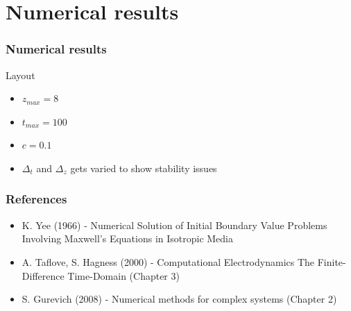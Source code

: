 \documentclass[ignorenonframetext]{beamer}
\begin{document}
\section{Numerical results}
\begin{frame}
\frametitle{Numerical results}
Layout
\begin{itemize}

\item $z_{max} = 8$
\item $t_{max} = 100$
\item $c = 0.1$
\item $\Delta_t$ and $\Delta_z$ gets varied to show stability issues
\end{itemize}
\end{frame}
\begin{frame}
\frametitle{References}
\begin{itemize}

\item K. Yee (1966) - Numerical Solution of Initial Boundary Value Problems Involving Maxwell’s Equations in Isotropic Media 
\item A. Taflove, S. Hagness (2000) - Computational Electrodynamics The Finite-Difference Time-Domain (Chapter 3) 
\item S. Gurevich (2008) - Numerical methods for complex systems (Chapter 2) 
\end{itemize}
\end{frame}

\end{document}
